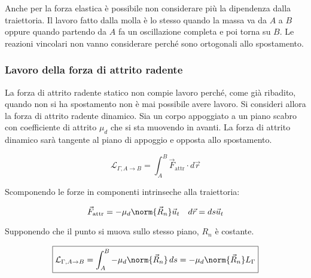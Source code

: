 \begin{figure}[htpb]
\end{figure}
\FloatBarrier
Anche per la forza elastica è possibile non considerare più la dipendenza dalla traiettoria. Il lavoro fatto dalla molla è lo stesso quando la massa va da $A$ a $B$ oppure quando partendo da $A$ fa un oscillazione completa
e poi torna su $B$. Le reazioni vincolari non vanno considerare perché sono ortogonali allo spostamento.

\subsubsection{Lavoro della forza di attrito radente}

La forza di attrito radente statico non compie lavoro perché, come già ribadito, quando non si ha spostamento non è mai possibile avere lavoro. Si consideri allora la forza di attrito radente dinamico. Sia un corpo appoggiato a un piano scabro con coefficiente di attrito $\mu_d$ che si sta muovendo in avanti. La forza di attrito dinamico sarà tangente al piano di appoggio e opposta allo spostamento.

\[
	\mathcal{L}_{\Gamma, A \to B}=\int_A^B \vec{F}_{\text{attr}} \cdot d\vec{r}
\]

Scomponendo le forze in componenti intrinseche alla traiettoria:

\[
	\vec{F}_{\text{attr}}=-\mu_d\norm{\vec{R}_n} \vec{u}_t \quad d\vec{r}=ds\vec{u}_t
\]

Supponendo che il punto si muova sullo stesso piano, $R_n$ è costante.

\[
	\boxed{\mathcal{L}_{\Gamma, A \to B}=\int_A^B -\mu_d\norm{\vec{R}_n} \,ds=-\mu_d\norm{\vec{R}_n}L_\Gamma}
\]

